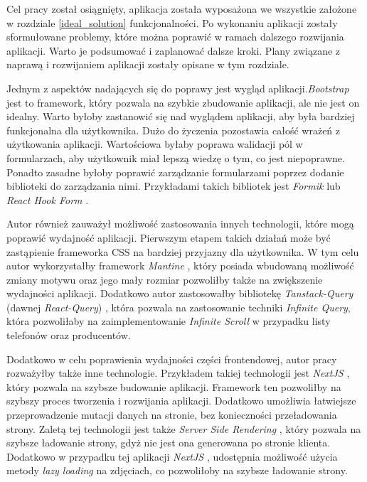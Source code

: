 Cel pracy został osiągnięty, aplikacja została wyposażona we wszystkie założone w rozdziale \ref{ideal_solution} funkcjonalności. Po wykonaniu aplikacji zostały sformułowane problemy, które można poprawić w ramach dalszego rozwijania aplikacji. Warto je podsumować i zaplanować dalsze kroki. Plany związane z naprawą i rozwijaniem aplikacji zostały opisane w tym rozdziale.

Jednym z aspektów nadających się do poprawy jest wygląd aplikacji.\linebreak\textit{Bootstrap} \cite{bootstrap} jest to framework, który pozwala na szybkie zbudowanie aplikacji, ale nie jest on idealny. Warto byłoby zastanowić się nad wyglądem aplikacji, aby była bardziej funkcjonalna dla użytkownika. Dużo do życzenia pozostawia całość wrażeń z użytkowania aplikacji. Wartościowa byłaby poprawa walidacji pól w formularzach, aby użytkownik miał lepszą wiedzę o tym, co jest niepoprawne. Ponadto zasadne byłoby poprawić zarządzanie formularzami poprzez dodanie biblioteki do zarządzania nimi. Przykładami takich bibliotek jest \textit{Formik} \cite{Formik} lub \linebreak \textit{React Hook Form} \cite{React_hook_form}. 

Autor również zauważył możliwość zastosowania innych technologii, które mogą poprawić wydajność aplikacji. Pierwszym etapem takich działań może być zastąpienie frameworka CSS na bardziej przyjazny dla użytkownika. W tym celu autor wykorzystałby framework \textit{Mantine} \cite{mantine}, który posiada wbudowaną możliwość zmiany motywu oraz jego mały rozmiar pozwoliłby także na zwiększenie wydajności aplikacji. Dodatkowo autor zastosowałby bibliotekę \textit{Tanstack-Query} (dawnej \textit{React-Query}) \cite{tanstack_query}, która pozwala na zastosowanie techniki \textit{Infinite Query}, która pozwoliłaby na zaimplementowanie \textit{Infinite Scroll} \cite{infinite_scroll} w przypadku listy telefonów oraz producentów.

Dodatkowo w celu poprawienia wydajności części frontendowej, autor pracy rozważyłby także inne technologie. Przykładem takiej technologii jest \textit{NextJS} \cite{nextjs}, który pozwala na szybsze budowanie aplikacji. Framework ten pozwoliłby na szybszy proces tworzenia i rozwijania aplikacji. Dodatkowo umożliwia łatwiejsze przeprowadzenie mutacji danych na stronie, bez konieczności przeładowania strony. Zaletą tej technologii jest także \textit{Server Side Rendering} \cite{SSR}, który pozwala na szybsze ładowanie strony, gdyż nie jest ona generowana po stronie klienta. Dodatkowo w przypadku tej aplikacji \textit{NextJS} \cite{nextjs}, udostępnia możliwość użycia metody \textit{lazy loading} na zdjęciach, co pozwoliłoby na szybsze ładowanie strony.

